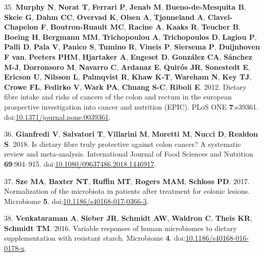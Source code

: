 \documentclass[11pt,]{article}
\begin{document}
\leavevmode\hypertarget{ref-Murphy2012}{}%
35. \textbf{Murphy N}, \textbf{Norat T}, \textbf{Ferrari P},
\textbf{Jenab M}, \textbf{Bueno-de-Mesquita B}, \textbf{Skeie G},
\textbf{Dahm CC}, \textbf{Overvad K}, \textbf{Olsen A},
\textbf{Tjønneland A}, \textbf{Clavel-Chapelon F},
\textbf{Boutron-Ruault MC}, \textbf{Racine A}, \textbf{Kaaks R},
\textbf{Teucher B}, \textbf{Boeing H}, \textbf{Bergmann MM},
\textbf{Trichopoulou A}, \textbf{Trichopoulos D}, \textbf{Lagiou P},
\textbf{Palli D}, \textbf{Pala V}, \textbf{Panico S}, \textbf{Tumino R},
\textbf{Vineis P}, \textbf{Siersema P}, \textbf{Duijnhoven F van},
\textbf{Peeters PHM}, \textbf{Hjartaker A}, \textbf{Engeset D},
\textbf{González CA}, \textbf{Sánchez M-J}, \textbf{Dorronsoro M},
\textbf{Navarro C}, \textbf{Ardanaz E}, \textbf{Quirós JR},
\textbf{Sonestedt E}, \textbf{Ericson U}, \textbf{Nilsson L},
\textbf{Palmqvist R}, \textbf{Khaw K-T}, \textbf{Wareham N}, \textbf{Key
TJ}, \textbf{Crowe FL}, \textbf{Fedirko V}, \textbf{Wark PA},
\textbf{Chuang S-C}, \textbf{Riboli E}. 2012. Dietary fibre intake and
risks of cancers of the colon and rectum in the european prospective
investigation into cancer and nutrition (EPIC). PLoS ONE
\textbf{7}:e39361.
doi:\href{https://doi.org/10.1371/journal.pone.0039361}{10.1371/journal.pone.0039361}.

\leavevmode\hypertarget{ref-Gianfredi2018}{}%
36. \textbf{Gianfredi V}, \textbf{Salvatori T}, \textbf{Villarini M},
\textbf{Moretti M}, \textbf{Nucci D}, \textbf{Realdon S}. 2018. Is
dietary fibre truly protective against colon cancer? A systematic review
and meta-analysis. International Journal of Food Sciences and Nutrition
\textbf{69}:904--915.
doi:\href{https://doi.org/10.1080/09637486.2018.1446917}{10.1080/09637486.2018.1446917}.

\leavevmode\hypertarget{ref-Sze2017}{}%
37. \textbf{Sze MA}, \textbf{Baxter NT}, \textbf{Ruffin MT},
\textbf{Rogers MAM}, \textbf{Schloss PD}. 2017. Normalization of the
microbiota in patients after treatment for colonic lesions. Microbiome
\textbf{5}.
doi:\href{https://doi.org/10.1186/s40168-017-0366-3}{10.1186/s40168-017-0366-3}.

\leavevmode\hypertarget{ref-Venkataraman2016}{}%
38. \textbf{Venkataraman A}, \textbf{Sieber JR}, \textbf{Schmidt AW},
\textbf{Waldron C}, \textbf{Theis KR}, \textbf{Schmidt TM}. 2016.
Variable responses of human microbiomes to dietary supplementation with
resistant starch. Microbiome \textbf{4}.
doi:\href{https://doi.org/10.1186/s40168-016-0178-x}{10.1186/s40168-016-0178-x}.
\end{document}
